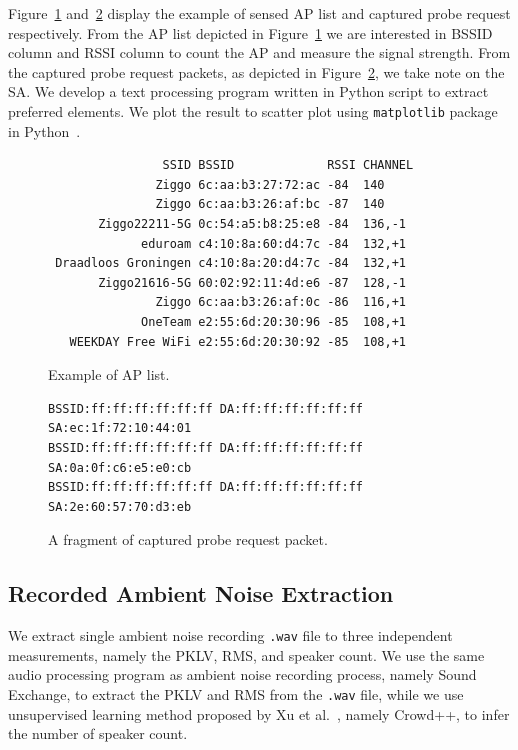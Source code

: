Figure~\ref{fig:ap-list-example} and~\ref{fig:probe-request-example} display the example of sensed \ac{AP} list and captured probe request respectively. From the \ac{AP} list depicted in Figure~\ref{fig:ap-list-example} we are interested in \ac{BSSID} column and \ac{RSSI} column to count the \ac{AP} and measure the signal strength. From the captured probe request packets, as depicted in Figure~\ref{fig:probe-request-example}, we take note on the \ac{SA}. We develop a text processing program written in Python script to extract preferred elements. We plot the result to scatter plot using \verb|matplotlib| package in Python~\cite{Hunter:2007}.

\begin{figure}[ht]
	\centering
\begin{verbatim}
                SSID BSSID             RSSI CHANNEL 
               Ziggo 6c:aa:b3:27:72:ac -84  140     
               Ziggo 6c:aa:b3:26:af:bc -87  140     
       Ziggo22211-5G 0c:54:a5:b8:25:e8 -84  136,-1  
             eduroam c4:10:8a:60:d4:7c -84  132,+1  
 Draadloos Groningen c4:10:8a:20:d4:7c -84  132,+1  
       Ziggo21616-5G 60:02:92:11:4d:e6 -87  128,-1  
               Ziggo 6c:aa:b3:26:af:0c -86  116,+1  
             OneTeam e2:55:6d:20:30:96 -85  108,+1  
   WEEKDAY Free WiFi e2:55:6d:20:30:92 -85  108,+1  
\end{verbatim}
	\caption{Example of \ac{AP} list.}
	\label{fig:ap-list-example}
\end{figure}

\begin{figure}[ht]
\centering
\begin{verbatim}
BSSID:ff:ff:ff:ff:ff:ff DA:ff:ff:ff:ff:ff:ff SA:ec:1f:72:10:44:01
BSSID:ff:ff:ff:ff:ff:ff DA:ff:ff:ff:ff:ff:ff SA:0a:0f:c6:e5:e0:cb
BSSID:ff:ff:ff:ff:ff:ff DA:ff:ff:ff:ff:ff:ff SA:2e:60:57:70:d3:eb
\end{verbatim}
\caption{A fragment of captured probe request packet.}
\label{fig:probe-request-example}
\end{figure}

\subsection{Recorded Ambient Noise Extraction} %
\label{sub:recorded_ambient_noise_extraction}
We extract single ambient noise recording \verb|.wav| file to three independent measurements, namely the \ac{PKLV}, \ac{RMS}, and speaker count. We use the same audio processing program as ambient noise recording process, namely Sound Exchange, to extract the \ac{PKLV} and \ac{RMS} from the \verb|.wav| file, while we use unsupervised learning method proposed by Xu et al.~\cite{thesis067}, namely Crowd++, to infer the number of speaker count.

